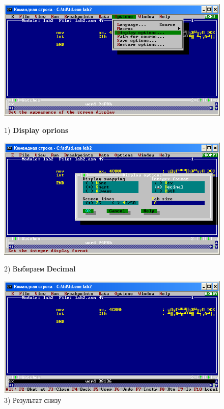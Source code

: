 \begin{figure}[!htp]
    \centering
    \begin{minipage}{0.32\textwidth}
        \centering
        \includegraphics[width=.99\linewidth]
            {../_INCLUDES/task-4-13-2/1.png}
        \caption{1) \textbf{Display oprions}}
        \label{fig:task_4_13_2__1}
    \end{minipage}
    \begin {minipage}{0.32\textwidth}
        \centering
        \includegraphics[width=.99\linewidth]
            {../_INCLUDES/task-4-13-2/2.png}
        \caption{2) Выбираем \textbf{Decimal}}
        \label{fig:task_4_13_2__2}
    \end{minipage}
    \begin {minipage}{0.32\textwidth}
        \centering
        \includegraphics[width=.99\linewidth]
            {../_INCLUDES/task-4-13-2/3.png}
        \caption{3) Результат снизу}
        \label{fig:task_4_13_2__3}
    \end{minipage}
\end{figure}
